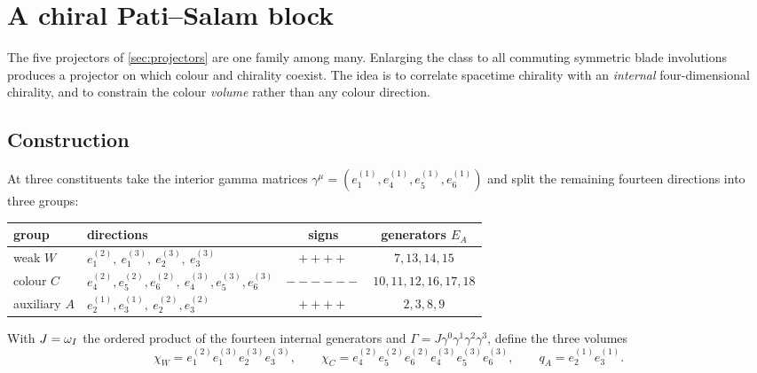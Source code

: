 \section{A chiral Pati--Salam block}
\label{sec:pstar}

The five projectors of \cref{sec:projectors} are one family among many. Enlarging the class to all commuting symmetric blade
involutions produces a projector on which colour and chirality coexist. The idea is to correlate spacetime chirality with an
\emph{internal} four-dimensional chirality, and to constrain the colour \emph{volume} rather than any colour direction.

\subsection{Construction}

At three constituents take the interior gamma matrices $\gamma^\mu=(e^{(1)}_1,e^{(1)}_4,e^{(1)}_5,e^{(1)}_6)$ and split the remaining
fourteen directions into three groups:
\begin{center}
\begin{tabular}{@{}llcc@{}}
\toprule
group & directions & signs & generators $E_A$\\
\midrule
weak $W$ & $e^{(2)}_1,\ e^{(3)}_1,\ e^{(3)}_2,\ e^{(3)}_3$ & $++++$ & $7,13,14,15$\\
colour $C$ & $e^{(2)}_4,e^{(2)}_5,e^{(2)}_6,\ e^{(3)}_4,e^{(3)}_5,e^{(3)}_6$ & $------$ & $10,11,12,16,17,18$\\
auxiliary $A$ & $e^{(1)}_2,e^{(1)}_3,\ e^{(2)}_2,e^{(2)}_3$ & $++++$ & $2,3,8,9$\\
\bottomrule
\end{tabular}
\end{center}
With $J=\omega_I$ the ordered product of the fourteen internal generators and $\Gamma=J\gamma^0\gamma^1\gamma^2\gamma^3$, define the three
volumes
\[
\chi_W=e^{(2)}_1e^{(3)}_1e^{(3)}_2e^{(3)}_3,\qquad
\chi_C=e^{(2)}_4e^{(2)}_5e^{(2)}_6e^{(3)}_4e^{(3)}_5e^{(3)}_6,\qquad
q_A=e^{(1)}_2e^{(1)}_3 .
\]

